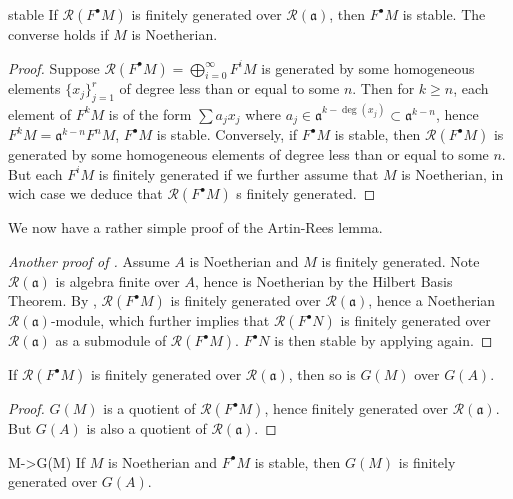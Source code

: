 \documentclass[10pt]{extarticle}
\begin{document}
\begin{proposition}{}{stable}
    If $\mathcal{R}(F^\bullet M)$ is finitely generated over $\mathcal{R}(\mathfrak{a})$, then $F^\bullet M$ is stable. The converse holds if $M$ is Noetherian.
\end{proposition}
\begin{proof}
    Suppose $\mathcal{R}(F^\bullet M)=\bigoplus_{i=0}^\infty F^iM$ is generated by some homogeneous elements $\{x_j\}_{j=1}^r$ of degree less than or equal to some $n$. Then for $k\geq n$, each element of $F^kM$ is of the form $\sum a_jx_j$ where $a_j\in \mathfrak{a}^{k-\deg(x_j)}\subset\mathfrak{a}^{k-n}$, hence $F^kM=\mathfrak{a}^{k-n}F^nM$, $F^\bullet M$ is stable. Conversely, if $F^\bullet M$ is stable, then $\mathcal{R}(F^\bullet M)$ is generated by some homogeneous elements of degree less than or equal to some $n$. But each $F^iM$ is finitely generated if we further assume that $M$ is Noetherian, in wich case we deduce that $\mathcal{R}(F^\bullet M)$ s finitely generated.
\end{proof}

We now have a rather simple proof of the Artin-Rees lemma. 
\begin{proof}[Another proof of ]
    Assume $A$ is Noetherian and $M$ is finitely generated. Note $\mathcal{R}(\mathfrak{a})$ is algebra finite over $A$, hence is Noetherian by the Hilbert Basis Theorem. By , $\mathcal{R}(F^\bullet M)$ is finitely generated over $\mathcal{R}(\mathfrak{a})$, hence a Noetherian $\mathcal{R}(\mathfrak{a})$-module, which further implies that $\mathcal{R}(F^\bullet N)$ is finitely generated over $\mathcal{R}(\mathfrak{a})$ as a submodule of $\mathcal{R}(F^\bullet M)$. $F^\bullet N$ is then stable by applying  again.
\end{proof}

\begin{proposition}{}{}
    If $\mathcal{R}(F^\bullet M)$ is finitely generated over $\mathcal{R}(\mathfrak{a})$, then so is $G(M)$ over $G(A)$.
\end{proposition}
\begin{proof}
    $G(M)$ is a quotient of $\mathcal{R}(F^\bullet M)$, hence  finitely generated over $\mathcal{R}(\mathfrak{a})$. But $G(A)$ is also a quotient of $\mathcal{R}(\mathfrak{a})$.
\end{proof}

\begin{corollary}{}{M->G(M)}
    If $M$ is Noetherian and $F^\bullet M$ is stable, then $G(M)$ is finitely generated over $G(A)$.
\end{corollary}
\end{document}
